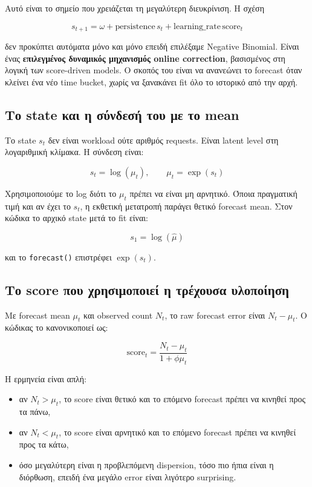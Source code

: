 \documentclass[11pt,a4paper]{article}
\newcommand{\equationnote}[1]{
  \begin{center}
    \colorbox{boxblue}{\parbox{0.92\linewidth}{\begin{equation*}#1\end{equation*}}}
  \end{center}
}
\newcommand{\code}[1]{\texttt{#1}}
\begin{document}
Αυτό είναι το σημείο που χρειάζεται τη μεγαλύτερη διευκρίνιση. Η σχέση

\equationnote{s_{t+1}=\omega+\text{persistence}\,s_t+\text{learning\_rate}\,\text{score}_t}

δεν προκύπτει αυτόματα μόνο και μόνο επειδή επιλέξαμε Negative Binomial.
Είναι ένας \textbf{επιλεγμένος δυναμικός μηχανισμός online correction},
βασισμένος στη λογική των score-driven models. Ο σκοπός του είναι να
ανανεώνει το forecast όταν κλείνει ένα νέο time bucket, χωρίς να ξανακάνει
fit όλο το ιστορικό από την αρχή.

\subsection{Το state και η σύνδεσή του με το mean}

Το state $s_t$ δεν είναι workload ούτε αριθμός requests. Είναι latent level
στη λογαριθμική κλίμακα. Η σύνδεση είναι:

\equationnote{s_t = \log(\mu_t), \qquad \mu_t = \exp(s_t)}

Χρησιμοποιούμε το log διότι το $\mu_t$ πρέπει να είναι μη αρνητικό. Όποια
πραγματική τιμή και αν έχει το $s_t$, η εκθετική μετατροπή παράγει θετικό
forecast mean. Στον κώδικα το αρχικό state μετά το fit είναι:

\equationnote{s_1 = \log(\hat{\mu})}

και το \code{forecast()} επιστρέφει $\exp(s_t)$.

\subsection{Το score που χρησιμοποιεί η τρέχουσα υλοποίηση}

Με forecast mean $\mu_t$ και observed count $N_t$, το raw forecast error είναι
$N_t-\mu_t$. Ο κώδικας το κανονικοποιεί ως:

\equationnote{
  \text{score}_t =
  \frac{N_t-\mu_t}{1+\phi\mu_t}
}

Η ερμηνεία είναι απλή:
\begin{itemize}
  \item αν $N_t>\mu_t$, το score είναι θετικό και το επόμενο forecast
        πρέπει να κινηθεί προς τα πάνω,
  \item αν $N_t<\mu_t$, το score είναι αρνητικό και το επόμενο forecast
        πρέπει να κινηθεί προς τα κάτω,
  \item όσο μεγαλύτερη είναι η προβλεπόμενη dispersion, τόσο πιο ήπια είναι
        η διόρθωση, επειδή ένα μεγάλο error είναι λιγότερο surprising.
\end{itemize}
\end{document}
